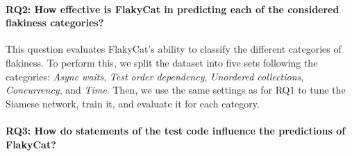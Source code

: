 \paragraph{  \textbf {RQ2: How effective is FlakyCat in predicting each of the considered flakiness categories?}}

This question evaluates FlakyCat's ability to classify the different categories of flakiness.
To perform this, we split the dataset into five sets following the categories: \textit{Async waits}, \textit{Test order dependency},  \textit{Unordered collections}, \textit{Concurrency}, and \textit{Time}.
Then, we use the same settings as for RQ1 to tune the Siamese network, train it, and evaluate it for each category.

\paragraph{  \textbf {RQ3: How do statements of the test code influence the predictions of FlakyCat?}}

